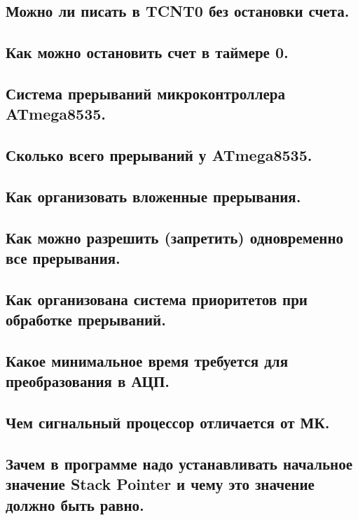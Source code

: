 \subsection{Можно ли писать в TCNT0 без остановки счета.}


\subsection{Как можно остановить счет в таймере 0.}


\subsection{Система прерываний микроконтроллера ATmega8535.}


\subsection{Сколько всего прерываний у ATmega8535.}


\subsection{Как организовать вложенные прерывания.}


\subsection{Как можно разрешить (запретить) одновременно все прерывания.}


\subsection{Как организована система приоритетов при обработке прерываний. }


\subsection{Какое минимальное время требуется для преобразования в АЦП.}


\subsection{Чем сигнальный процессор отличается от МК.}


\subsection{Зачем в программе надо устанавливать начальное значение Stack Pointer и чему это значение должно быть равно.}


